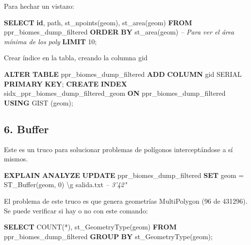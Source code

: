 \documentclass[spanish,]{article}
\newenvironment{Shaded}{}{}
\newcommand{\KeywordTok}[1]{\textcolor[rgb]{0.00,0.44,0.13}{\textbf{{#1}}}}
\newcommand{\DecValTok}[1]{\textcolor[rgb]{0.25,0.63,0.44}{{#1}}}
\newcommand{\CommentTok}[1]{\textcolor[rgb]{0.38,0.63,0.69}{\textit{{#1}}}}
\newcommand{\FunctionTok}[1]{\textcolor[rgb]{0.02,0.16,0.49}{{#1}}}
\newcommand{\NormalTok}[1]{{#1}}
\begin{document}
Para hechar un vistazo:

\begin{Shaded}
\begin{Highlighting}[]
\KeywordTok{SELECT} \KeywordTok{id}\NormalTok{, path, st_npoints(geom), st_area(geom) }
  \KeywordTok{FROM} \NormalTok{ppr_biomes_dump_filtered}
 \KeywordTok{ORDER} \KeywordTok{BY} \NormalTok{st_area(geom) }\CommentTok{-- Para ver el área mínima de los poly}
 \KeywordTok{LIMIT} \DecValTok{10}\NormalTok{;}
\end{Highlighting}
\end{Shaded}

Crear índice en la tabla, creando la columna gid

\begin{Shaded}
\begin{Highlighting}[]
\KeywordTok{ALTER} \KeywordTok{TABLE} \NormalTok{ppr_biomes_dump_filtered }\KeywordTok{ADD} \KeywordTok{COLUMN} \NormalTok{gid SERIAL }\KeywordTok{PRIMARY} \KeywordTok{KEY}\NormalTok{;}
\KeywordTok{CREATE} \KeywordTok{INDEX} \NormalTok{sidx_ppr_biomes_dump_filtered_geom }
    \KeywordTok{ON} \NormalTok{ppr_biomes_dump_filtered }\KeywordTok{USING} \NormalTok{GIST (geom);}
\end{Highlighting}
\end{Shaded}

\subsection{6. Buffer}\label{buffer}

Este es un truco para solucionar problemas de polígonos interceptándose
a sí mismos.

\begin{Shaded}
\begin{Highlighting}[]
\KeywordTok{EXPLAIN} \KeywordTok{ANALYZE} \KeywordTok{UPDATE} \NormalTok{ppr_biomes_dump_filtered }
  \KeywordTok{SET} \NormalTok{geom = ST_Buffer(geom, }\DecValTok{0}\NormalTok{) \textbackslash{}g salida.txt}
\CommentTok{-- 3'42"}
\end{Highlighting}
\end{Shaded}

El problema de este truco es que genera geometrías MultiPolygon (96 de
431296). Se puede verificar si hay o no con este comando:

\begin{Shaded}
\begin{Highlighting}[]
\KeywordTok{SELECT} \FunctionTok{COUNT}\NormalTok{(*), st_GeometryType(geom) }
  \KeywordTok{FROM} \NormalTok{ppr_biomes_dump_filtered }
 \KeywordTok{GROUP} \KeywordTok{BY} \NormalTok{st_GeometryType(geom);}
\end{Highlighting}
\end{Shaded}
\end{document}
